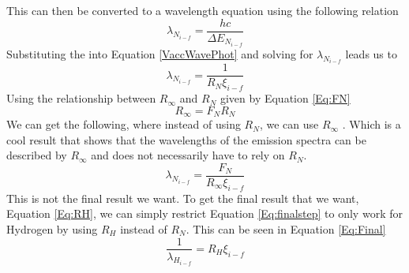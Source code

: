 \documentclass[%
 aps,%
 pra,%
 preprint, %
 amsmath, %
 amsfonts, %
 amssymb, %
]{revtex4-2}
\newcommand{\Rin}{$R_\infty$ }
\begin{document}
This can then be converted to a wavelength equation using the following relation
\begin{equation}
    \label{VaccWavePhot}
    \lambda_{N_{i-f}}=\frac{hc}{\Delta E_{N_{i-f}}}
\end{equation}{}
Substituting the into Equation \ref{VaccWavePhot} and solving for $\lambda_{N_{i-f}}$ leads us to
\begin{equation}
\label{Eq:finalstep}
    \lambda_{N_{i-f}}=\frac{1}{R_N\xi_{i-f}}
\end{equation}{}
Using the relationship between \Rin  and $R_N$ given by Equation \ref{Eq:FN}
\begin{equation}
    \label{Eq:FN}
    R_\infty=F_NR_N
\end{equation}{}
We can get the following, where instead of using $R_N$, we can use \Rin . Which is a cool result that shows that the wavelengths of the emission spectra can be described by \Rin  and does not necessarily have to rely on $R_N$.
\begin{equation}
\label{Eq:lambdaN}
\lambda_{N_{i-f}}=\frac{F_N}{R_\infty\xi_{i-f}}
\end{equation}{}
This is not the final result we want. To get the final result that we want, Equation \ref{Eq:RH}, we can simply restrict Equation \ref{Eq:finalstep} to only work for Hydrogen by using $R_H$ instead of $R_N$. This can be seen in Equation \ref{Eq:Final}
\begin{equation}
\label{Eq:Final}
    \frac{1}{\lambda_{H_{i-f}}}=R_H\xi_{i-f}
\end{equation}{}
\end{document}
